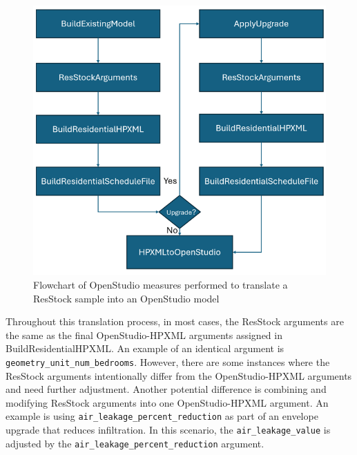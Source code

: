 \begin{figure}
    \centering
    \includegraphics[width=1\linewidth]{ResStock Technical Reference Guide/images/OSHPXML.png}
    \caption{Flowchart of OpenStudio measures performed to translate a ResStock sample into an OpenStudio model}
    \label{fig:os-hpxml}
\end{figure}

Throughout this translation process, in most cases, the ResStock arguments are the same as the final OpenStudio-HPXML arguments assigned in BuildResidentialHPXML. An example of an identical argument is \texttt{geometry\_unit\_num\_bedrooms}. However, there are some instances where the ResStock arguments intentionally differ from the OpenStudio-HPXML arguments and need further adjustment.  Another potential difference is combining and modifying ResStock arguments into one OpenStudio-HPXML argument. An example is using \texttt{air\_leakage\_percent\_reduction} as part of an envelope upgrade that reduces infiltration. In this scenario, the \texttt{air\_leakage\_value} is adjusted by the \texttt{air\_leakage\_percent\_reduction} argument.

